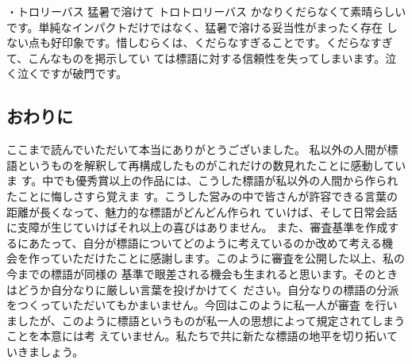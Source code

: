 ・トロリーバス 猛暑で溶けて トロトロリーバス
かなりくだらなくて素晴らしいです。単純なインパクトだけではなく、猛暑で溶ける妥当性がまったく存在
しない点も好印象です。惜しむらくは、くだらなすぎることです。くだらなすぎて、こんなものを掲示してい
ては標語に対する信頼性を失ってしまいます。泣く泣くですが破門です。

\subsection{おわりに}
ここまで読んでいただいて本当にありがとうございました。
私以外の人間が標語というものを解釈して再構成したものがこれだけの数見れたことに感動していま
す。中でも優秀賞以上の作品には、こうした標語が私以外の人間から作られたことに悔しさすら覚えま
す。こうした営みの中で皆さんが許容できる言葉の距離が長くなって、魅力的な標語がどんどん作られ
ていけば、そして日常会話に支障が生じていけばそれ以上の喜びはありません。
また、審査基準を作成するにあたって、自分が標語についてどのように考えているのか改めて考える機
会を作っていただけたことに感謝します。このように審査を公開した以上、私の今までの標語が同様の
基準で眼差される機会も生まれると思います。そのときはどうか自分なりに厳しい言葉を投げかけてく
ださい。自分なりの標語の分派をつくっていただいてもかまいません。今回はこのように私一人が審査
を行いましたが、このように標語というものが私一人の思想によって規定されてしまうことを本意には考
えていません。私たちで共に新たな標語の地平を切り拓いていきましょう。